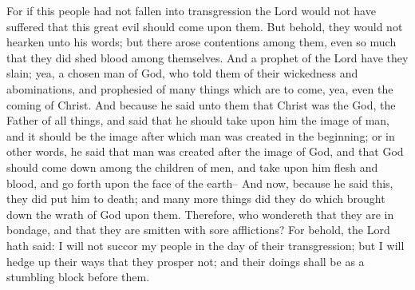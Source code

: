 For if this people had not fallen into transgression the Lord would not have suffered that this great evil should come upon them. But behold, they would not hearken unto his words; but there arose contentions among them, even so much that they did shed blood among themselves.
\bverse \iffalse And a prophet of the Lord have they slain; yea, a chosen man of God, who told them of their wickedness and abominations, and prophesied of many things which are to come, yea, even the coming of Christ. \fi
And a prophet of the Lord have they slain; yea, a chosen man of God, who told them of their wickedness and abominations, and prophesied of many things which are to come, yea, even the coming of Christ.
\bverse \iffalse And because he said unto them that Christ was the God, the Father of all things, and said that he should take upon him the image of man, and it should be the image after which man was created in the beginning; or in other words, he said that man was created after the image of God, and that God should come down among the children of men, and take upon him flesh and blood, and go forth upon the face of the earth-- \fi
And because he said unto them that Christ was the God, the Father of all things, and said that he should take upon him the image of man, and it should be the image after which man was created in the beginning; or in other words, he said that man was created after the image of God, and that God should come down among the children of men, and take upon him flesh and blood, and go forth upon the face of the earth--
\bverse \iffalse And now, because he said this, they did put him to death; and many more things did they do which brought down the wrath of God upon them. Therefore, who wondereth that they are in bondage, and that they are smitten with sore afflictions? \fi
And now, because he said this, they did put him to death; and many more things did they do which brought down the wrath of God upon them. Therefore, who wondereth that they are in bondage, and that they are smitten with sore afflictions?
\bverse \iffalse For behold, the Lord hath said: I will not succor my people in the day of their transgression; but I will hedge up their ways that they prosper not; and their doings shall be as a stumbling block before them. \fi
For behold, the Lord hath said: I will not succor my people in the day of their transgression; but I will hedge up their ways that they prosper not; and their doings shall be as a stumbling block before them.
\bverse \iffalse And again, he saith: If my people shall sow filthiness they shall reap the chaff thereof in the whirlwind; and the effect thereof is poison. \fi
